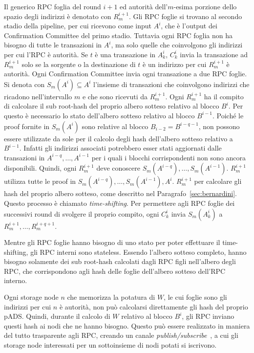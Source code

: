 Il generico RPC foglia del round $i+1$ ed autorità dell'$m$-esima porzione dello spazio degli indirizzi è denotato con $R_m^{i+1}$. Gli RPC foglie si trovano al secondo stadio della pipeline, per cui ricevono come input $A^i$, che è l'output dei Confirmation Committee del primo stadio. Tuttavia ogni RPC foglia non ha bisogno di tutte le transazioni in $A^i$, ma solo quelle che coinvolgono gli indirizzi per cui l'RPC è autorità. Se $t$ è una transazione in $A_k^i$, $C_k^i$ invia la transazione ad $R_m^{i+1}$ solo se la sorgente o la destinazione di $t$ è un indirizzo per cui $R_m^{i+1}$ è autorità. Ogni Confirmation Committee invia ogni transazione a due RPC foglie. Si denota con $S_m(A^i) \subseteq A^i$ l'insieme di transazioni che coinvolgono indirizzi che ricadono nell'intervallo $m$ e che sono ricevuti da $R_m^{i+1}$. Ogni $R_m^{i+1}$ ha il compito di calcolare il sub root-hash del proprio albero sotteso relativo al blocco $B^i$. Per questo è necessario lo stato dell'albero sotteso relativo al blocco $B^{i-1}$. Poiché le proof fornite in $S_m(A^i)$ sono relative al blocco $B_{i-2} = B^{i-q-1}$, non possono essere utilizzate da sole per il calcolo degli hash dell'albero sotteso relativo a $B^{i-1}$. Infatti gli indirizzi associati potrebbero esser stati aggiornati dalle transazioni in $A^{i-q}, \dots, A^{i-1}$ per i quali i blocchi corrispondenti non sono ancora disponibili. Quindi, ogni $R_m^{i+1}$ deve conoscere $S_m(A^{i-q}), \dots, S_m(A^{i-1})$. $R_m^{i+1}$ utilizza tutte le proof in $S_m(A^{i-q}), \dots, S_m(A^{i-1}), A^i$. $R_m^{i+1}$ per calcolare gli hash del proprio albero sotteso, come descritto nel Paragrafo~\ref{sec:bernardini}. Questo processo è chiamato \emph{time-shifting}. Per permettere agli RPC foglie dei successivi round di svolgere il proprio compito, ogni $C_k^i$ invia $S_m(A_k^i)$ a $R_m^{i+1}, \dots, R_m^{i+q+1}$.

Mentre gli RPC foglie hanno bisogno di uno stato per poter effettuare il time-shifting, gli RPC interni sono stateless. Essendo l'albero sotteso completo, hanno bisogno solamente dei sub root-hash calcolati dagli RPC figli nell'albero degli RPC, che corrispondono agli hash delle foglie dell'albero sotteso dell'RPC interno.

Ogni storage node $n$ che memorizza la potatura di $W$, le cui foglie sono gli indirizzi per cui $n$ è autorità, non può calcolarsi direttamente gli hash del proprio pADS. Quindi, durante il calcolo di $W$ relativo al blocco $B^i$, gli RPC inviano questi hash ai nodi che ne hanno bisogno. Questo può essere realizzato in maniera del tutto trasparente agli RPC, creando un canale \textit{publish/subscribe}~\cite{eugster2003many}, a cui gli storage node interessati per un sottoinsieme di nodi potati si iscrivono.


